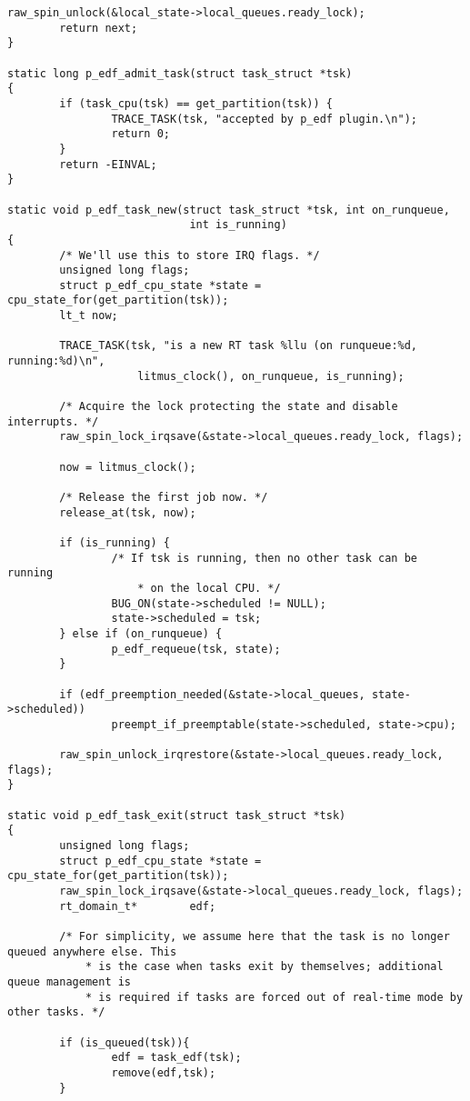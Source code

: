 \begin{lstlisting}[style=cstyle, caption=linux/litmus/sched\_p\_edf.c]
        raw_spin_unlock(&local_state->local_queues.ready_lock);
        return next;
}

static long p_edf_admit_task(struct task_struct *tsk)
{
        if (task_cpu(tsk) == get_partition(tsk)) {
                TRACE_TASK(tsk, "accepted by p_edf plugin.\n");
                return 0;
        }
        return -EINVAL;
}

static void p_edf_task_new(struct task_struct *tsk, int on_runqueue,
                            int is_running)
{
        /* We'll use this to store IRQ flags. */
        unsigned long flags;
        struct p_edf_cpu_state *state = cpu_state_for(get_partition(tsk));
        lt_t now;

        TRACE_TASK(tsk, "is a new RT task %llu (on runqueue:%d, running:%d)\n",
                    litmus_clock(), on_runqueue, is_running);

        /* Acquire the lock protecting the state and disable interrupts. */
        raw_spin_lock_irqsave(&state->local_queues.ready_lock, flags);

        now = litmus_clock();

        /* Release the first job now. */
        release_at(tsk, now);

        if (is_running) {
                /* If tsk is running, then no other task can be running
                    * on the local CPU. */
                BUG_ON(state->scheduled != NULL);
                state->scheduled = tsk;
        } else if (on_runqueue) {
                p_edf_requeue(tsk, state);
        }

        if (edf_preemption_needed(&state->local_queues, state->scheduled))
                preempt_if_preemptable(state->scheduled, state->cpu);

        raw_spin_unlock_irqrestore(&state->local_queues.ready_lock, flags);
}

static void p_edf_task_exit(struct task_struct *tsk)
{
        unsigned long flags;
        struct p_edf_cpu_state *state = cpu_state_for(get_partition(tsk));
        raw_spin_lock_irqsave(&state->local_queues.ready_lock, flags);
        rt_domain_t*		edf;

        /* For simplicity, we assume here that the task is no longer queued anywhere else. This
            * is the case when tasks exit by themselves; additional queue management is
            * is required if tasks are forced out of real-time mode by other tasks. */
        
        if (is_queued(tsk)){
                edf = task_edf(tsk);
                remove(edf,tsk);
        }


\end{lstlisting}
